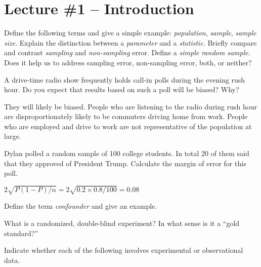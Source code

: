 \documentclass[addpoints,12pt]{exam}
\begin{document}
\section*{Lecture \#1 -- Introduction}
\begin{questions}
  \question Define the following terms and give a simple example: \emph{population}, \emph{sample}, \emph{sample size}.
  \question Explain the distinction between a \emph{parameter} and a \emph{statistic}.
  \question Briefly compare and contrast \emph{sampling} and \emph{non-sampling} error.
  \question Define a \emph{simple random sample}. Does it help us to address sampling error, non-sampling error, both, or neither? 

\question A drive-time radio show frequently holds call-in polls during the evening rush hour. Do you expect that results based on such a poll will be biased? Why? 
	\begin{solution}
    They will likely be biased.
		People who are listening to the radio during rush hour are disproportionately likely to be commuters driving home from work. People who are employed and drive to work are not representative of the population at large.  
	\end{solution}


\question Dylan polled a random sample of 100 college students. In total 20 of them said that they approved of President Trump. Calculate the margin of error for this poll.
\begin{solution}
  $2 \sqrt{P(1-P)/n} = 2 \sqrt{0.2 \times 0.8 / 100} = 0.08$
\end{solution}

\question Define the term \emph{confounder} and give an example.

\question What is a randomized, double-blind experiment? In what sense is it a ``gold standard?'' 

	
\question Indicate whether each of the following involves experimental or observational data.
\end{questions}
\end{document}
